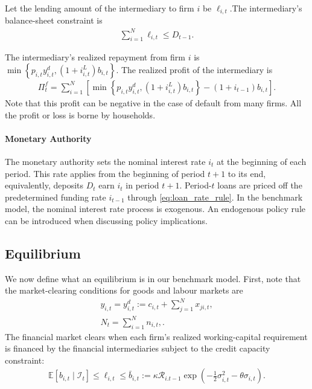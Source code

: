 \documentclass[12pt]{article}
\numberwithin{equation}{section}
\begin{document}
Let the lending amount of the intermediary to firm $i$ be $\ell_{i,t}$.The intermediary's balance-sheet constraint is
\begin{align}\label{eq:balance_sheet_constraint}
    \sum_{i=1}^N \ell_{i,t}
    \leq
    D_{t-1}.
\end{align}

The intermediary's realized repayment from firm $i$ is $\min \left\{p_{i,t}y^d_{i,t}, (1+i^L_{i,t})b_{i,t}\right\}$. The realized profit of the intermediary is
\begin{align}\label{eq:fi_profit}
    \Pi^f_t = \sum_{i=1}^N
    \left[ \min \left\{ p_{i,t}y^d_{i,t}, (1+i^L_{i,t})b_{i,t} \right\} - (1+i_{t-1})b_{i,t} \right].
\end{align}
Note that this profit can be negative in the case of default from many firms. All the profit or loss is borne by households.

\noindent \paragraph{Monetary Authority} The monetary authority sets the nominal interest rate $i_t$ at the beginning of each period. This rate applies from the beginning of period $t+1$ to its end, equivalently, deposits $D_t$ earn $i_t$ in period $t+1$. Period-$t$ loans are priced off the predetermined funding rate $i_{t-1}$ through \eqref{eq:loan_rate_rule}. In the benchmark model, the nominal interest rate process is exogenous. An endogenous policy rule can be introduced when discussing policy implications.

\subsection{Equilibrium}\label{sec:benchmark_equilibrium}
We now define what an equilibrium is in our benchmark model. First, note that the market-clearing conditions for goods and labour markets are
\begin{align}
    y_{i,t} = y^d_{i,t} := c_{i,t} + \sum_{j=1}^N x_{ji,t}, \label{eq:goods_market_clear}\\
    N_t = \sum_{i=1}^N n_{i,t}, \label{eq:labor_market_clear}.
\end{align}
The financial market clears when each firm's realized working-capital requirement is financed by the financial intermediaries subject to the credit capacity constraint:
\begin{align}\label{eq: credit_capacity_constraint}
    \mathbb{E}\left[b_{i,t} \mid \mathcal{I}_t\right] \leq \ell_{i,t} \leq \bar b_{i,t} := \kappa \mathcal{R}_{i.t-1} \exp \left(-\frac12\sigma^2_{i,t} - \theta\sigma_{i,t}\right).
\end{align}
\end{document}
